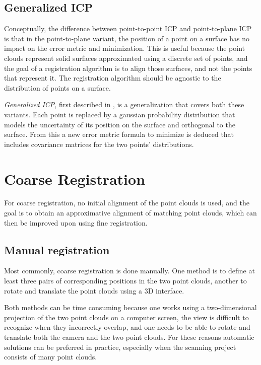 \subsection{Generalized ICP}
Conceptually, the difference between point-to-point ICP and point-to-plane ICP is that in the point-to-plane variant, the position of a point on a surface has no impact on the error metric and minimization. This is useful because the point clouds represent solid surfaces approximated using a discrete set of points, and the goal of a registration algorithm is to align those surfaces, and not the points that represent it. The registration algorithm should be agnostic to the distribution of points on a surface.

\emph{Generalized ICP}, first described in \cite{Sega2009}, is a generalization that covers both these variants. Each point is replaced by a gaussian probability distribution that models the uncertainty of its position on the surface and orthogonal to the surface. From this a new error metric formula to minimize is deduced that includes covariance matrices for the two points' distributions.


\section{Coarse Registration}
For coarse registration, no initial alignment of the point clouds is used, and the goal is to obtain an approximative alignment of matching point clouds, which can then be improved upon using fine registration. 

\subsection{Manual registration}
Most commonly, coarse registration is done manually. One method is to define at least three pairs of corresponding positions in the two point clouds, another to rotate and translate the point clouds using a 3D interface.

Both methods can be time consuming because one works using a two-dimensional projection of the two point clouds on a computer screen, the view is difficult to recognize when they incorrectly overlap, and one needs to be able to rotate and translate both the camera and the two point clouds. For these reasons automatic solutions can be preferred in practice, especially when the scanning project consists of many point clouds.
